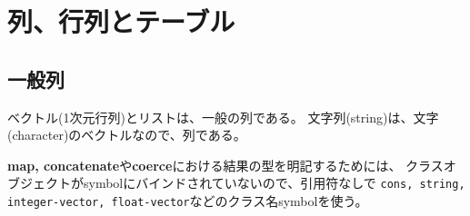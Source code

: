 \section{列、行列とテーブル}

\subsection{一般列}

ベクトル(1次元行列)とリストは、一般の列である。
文字列(string)は、文字(character)のベクトルなので、列である。

{\bf map, concatenate}や{\bf coerce}における結果の型を明記するためには、
クラスオブジェクトがsymbolにバインドされていないので、引用符なしで
{\tt cons, string, integer-vector, float-vector}などのクラス名symbolを使う。

